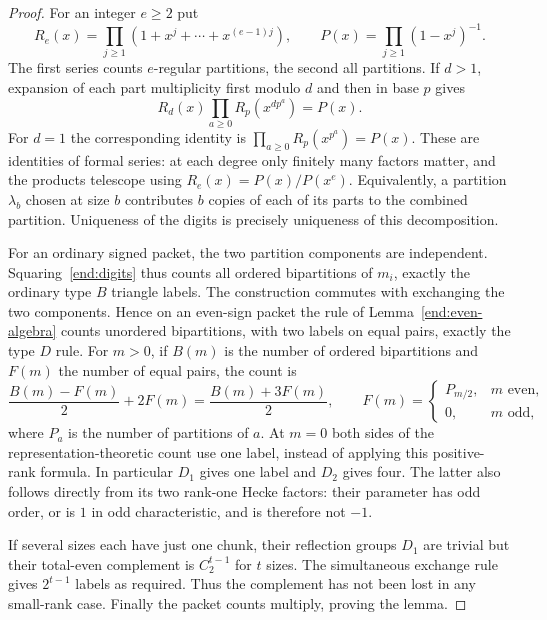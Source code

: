 \begin{proof}
For an integer $e\geq2$ put
\[
 R_e(x)=\prod_{j\geq1}(1+x^j+\cdots+x^{(e-1)j}),
 \qquad
 P(x)=\prod_{j\geq1}(1-x^j)^{-1}.
\]
The first series counts $e$-regular partitions, the second all
partitions.  If $d>1$, expansion of each part multiplicity
first modulo $d$ and then in base $p$ gives
\begin{equation}\label{end:digits}
 R_d(x)\prod_{a\geq0}R_p(x^{dp^a})=P(x).
\end{equation}
For $d=1$ the corresponding identity is
$\prod_{a\geq0}R_p(x^{p^a})=P(x)$.  These are identities of
formal series: at each degree only finitely many factors
matter, and the products telescope using
$R_e(x)=P(x)/P(x^e)$.  Equivalently, a partition $\lambda_b$
chosen at size $b$ contributes $b$ copies of each of its
parts to the combined partition.  Uniqueness of the digits
is precisely uniqueness of this decomposition.

For an ordinary signed packet, the two partition components
are independent.  Squaring~\eqref{end:digits} thus counts all
ordered bipartitions of $m_i$, exactly the ordinary type $B$
triangle labels.  The construction commutes with exchanging
the two components.  Hence on an even-sign packet the rule
of Lemma~\ref{end:even-algebra} counts unordered bipartitions,
with two labels on equal pairs, exactly the type $D$ rule.
For $m>0$, if $B(m)$ is the number of ordered bipartitions and
$F(m)$ the number of equal pairs, the count is
\[
 \frac{B(m)-F(m)}2+2F(m)=\frac{B(m)+3F(m)}2,
 \qquad
 F(m)=\begin{cases}P_{m/2},&m\text{ even},\\0,&m\text{ odd},\end{cases}
\]
where $P_a$ is the number of partitions of $a$.  At $m=0$
both sides of the representation-theoretic count use one
label, instead of applying this positive-rank formula.
In particular $D_1$ gives one label and $D_2$ gives four.
The latter also follows directly from its two rank-one
Hecke factors: their parameter has odd order, or is $1$ in
odd characteristic, and is therefore not $-1$.

If several sizes each have just one chunk, their reflection
groups $D_1$ are trivial but their total-even complement is
$C_2^{t-1}$ for $t$ sizes.  The simultaneous exchange rule
gives $2^{t-1}$ labels as required.  Thus the complement
has not been lost in any small-rank case.  Finally the
packet counts multiply, proving the lemma.
\end{proof}

